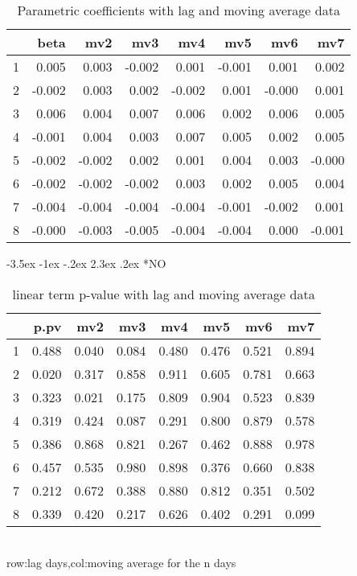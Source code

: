 \documentclass[a4paper, 12pt]{article}
\makeatletter
\def\large{\fontsize{14}{20}\selectfont}
\renewcommand\subsection{\@startsection {subsection}{1}{\z@}%
                                   {-3.5ex \@plus -1ex \@minus -.2ex}%
                                   {2.3ex \@plus.2ex}%
                                   {\centering\normalfont\large\bfseries}}
\makeatother
\begin{document}
\begin{table}[h]
\centering
\caption{Parametric coefficients with lag and moving average data}
\begin{tabular}{rrrrrrrr}
  \hline
 & beta & mv2 & mv3 & mv4 & mv5 & mv6 & mv7 \\
  \hline
1 & 0.005 & 0.003 & -0.002 & 0.001 & -0.001 & 0.001 & 0.002 \\
  2 & -0.002 & 0.003 & 0.002 & -0.002 & 0.001 & -0.000 & 0.001 \\
  3 & 0.006 & 0.004 & 0.007 & 0.006 & 0.002 & 0.006 & 0.005 \\
  4 & -0.001 & 0.004 & 0.003 & 0.007 & 0.005 & 0.002 & 0.005 \\
  5 & -0.002 & -0.002 & 0.002 & 0.001 & 0.004 & 0.003 & -0.000 \\
  6 & -0.002 & -0.002 & -0.002 & 0.003 & 0.002 & 0.005 & 0.004 \\
  7 & -0.004 & -0.004 & -0.004 & -0.004 & -0.001 & -0.002 & 0.001 \\
  8 & -0.000 & -0.003 & -0.005 & -0.004 & -0.004 & 0.000 & -0.001 \\
   \hline
\end{tabular}
\end{table}
\clearpage
\subsection*{NO}
\begin{table}[h]
\centering
\caption{linear term p-value with lag and moving average data}
\begin{tabular}{rrrrrrrr}
  \hline
 & p.pv & mv2 & mv3 & mv4 & mv5 & mv6 & mv7 \\
  \hline
1 & 0.488 & 0.040 & 0.084 & 0.480 & 0.476 & 0.521 & 0.894 \\
  2 & 0.020 & 0.317 & 0.858 & 0.911 & 0.605 & 0.781 & 0.663 \\
  3 & 0.323 & 0.021 & 0.175 & 0.809 & 0.904 & 0.523 & 0.839 \\
  4 & 0.319 & 0.424 & 0.087 & 0.291 & 0.800 & 0.879 & 0.578 \\
  5 & 0.386 & 0.868 & 0.821 & 0.267 & 0.462 & 0.888 & 0.978 \\
  6 & 0.457 & 0.535 & 0.980 & 0.898 & 0.376 & 0.660 & 0.838 \\
  7 & 0.212 & 0.672 & 0.388 & 0.880 & 0.812 & 0.351 & 0.502 \\
  8 & 0.339 & 0.420 & 0.217 & 0.626 & 0.402 & 0.291 & 0.099 \\
   \hline
\end{tabular}
\\row:lag days,col:moving average for the n days
\end{table}
\end{document}
